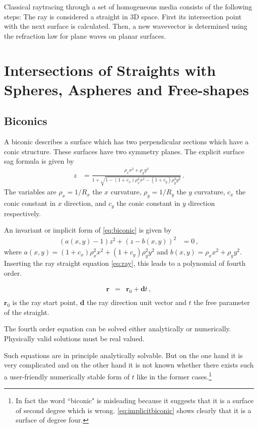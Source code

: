 \documentclass[12pt,a4paper,twoside,openright,BCOR10mm,headsepline,titlepage,abstracton,chapterprefix,final]{scrreprt}
\newcommand\Vector[1]{{\mathbf{#1}}}
\newcommand\Location{\Vector{r}}
\newif\ifdraft
\begin{document}
Classical raytracing through a set of homogeneous media consists of the following steps: The ray is considered a straight in 3D space. First its intersection point with the next surface is calculated. 
Then, a new wavevector is determined using the refraction law for plane waves on planar surfaces.

\section{Intersections of Straights with Spheres, Aspheres and Free-shapes}\label{subsec:intersectionformulas}

\subsection{Biconics}
A biconic describes a surface which has two perpendicular sections
which have a conic structure. These surfaces have two symmetry planes.
The explicit surface sag formula is given by
\begin{align}
 z &= \frac{\rho_x x^2 + \rho_y y^2}{1 + \sqrt{1 - (1+c_x) \rho_x^2 x^2 - (1+c_y) \rho_y^2 y^2}} \label{eq:biconic}\,.
\end{align}
The variables are $\rho_x = 1/R_x$ the $x$ curvature, $\rho_y = 1/R_y$ the $y$ curvature, $c_x$ the conic constant in $x$ direction,
and $c_y$ the conic constant in $y$ direction respectively. 

An invariant or implicit form of \eqref{eq:biconic} is given by
\begin{align}
 (a(x,y) - 1) z^2 + (z - b(x,y))^2 &= 0\,,\label{eq:implicitbiconic}
\end{align}
where $a(x,y) = (1 + c_x) \rho_x^2 x^2 + (1 + c_y) \rho_y^2 y^2$ and $b(x,y) = \rho_x x^2 + \rho_y y^2$. 
Inserting the ray straight equation \eqref{eq:ray}, this leads to a polynomial of fourth order.

\begin{eqnarray}
 \Location &=& \Location_0 + \Vector{d} t \label{eq:ray}\,,\\
\end{eqnarray}
$\Location_0$ is the ray start point, $\Vector{d}$ the ray direction unit vector and $t$ the free parameter of the straight.

The fourth order equation can be solved either analytically or numerically.
Physically valid solutions must be real valued.

\ifdraft
Such equations are in principle analytically solvable. But on the one hand it is very complicated and on the other hand 
it is not known whether there exists such a user-friendly numerically stable form of $t$ like in the former cases.\footnote{
In fact the word ``biconic" is misleading because it suggests that
it is a surface of second degree which is wrong. \eqref{eq:implicitbiconic}
shows clearly that it is a surface of degree four.}
\end{document}

